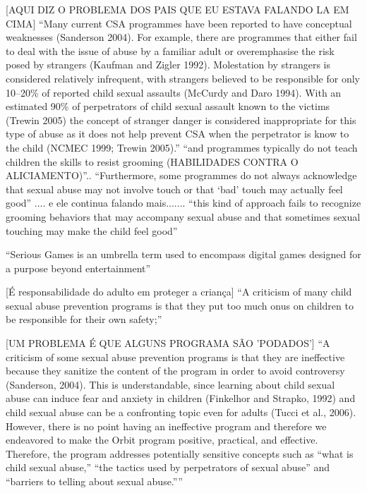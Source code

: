 [AQUI DIZ O PROBLEMA DOS PAIS QUE EU ESTAVA FALANDO LA EM CIMA]
``Many current CSA programmes have been reported to have conceptual weaknesses (Sanderson 2004). For example, there are programmes that either fail to deal with the issue of abuse by a familiar adult or overemphasise the risk posed by strangers (Kaufman and Zigler 1992). Molestation by strangers is considered relatively infrequent, with strangers believed to be responsible for only 10–20\% of reported child sexual assaults (McCurdy and Daro 1994). With an estimated 90\% of perpetrators of child sexual assault known to the victims (Trewin 2005) the concept of stranger danger is considered inappropriate for this type of abuse as it does not help prevent CSA when the perpetrator is know to the child (NCMEC 1999; Trewin 2005).''\cite{dip2016advancing} ``and programmes typically do not teach children the skills to resist grooming (HABILIDADES CONTRA O ALICIAMENTO)''.. ``Furthermore, some programmes do not always acknowledge that sexual abuse may not involve touch or that ‘bad’ touch may actually feel good'' .... e ele continua falando mais....... ``this kind of approach fails to recognize grooming behaviors that may accompany sexual abuse and that sometimes sexual touching may make the child feel good''



``Serious Games is an umbrella term used to encompass digital games designed for a purpose beyond entertainment''\cite{dip2016advancing}


[É responsabilidade do adulto em proteger a criança]
``A criticism of many child sexual abuse prevention programs is that they put too much onus on children to be responsible for their own safety;'' \cite{dip2016advancing}

[UM PROBLEMA É QUE ALGUNS PROGRAMA SÃO 'PODADOS']
``A criticism of some sexual abuse prevention programs is that they are ineffective because they sanitize the content of the program in order to avoid controversy (Sanderson, 2004). This is understandable, since learning about child sexual abuse can induce fear and anxiety in children (Finkelhor and Strapko, 1992) and child sexual abuse can be a confronting topic even for adults (Tucci et al., 2006). However, there is no point having an ineffective program and therefore we endeavored to make the Orbit program positive, practical, and effective. Therefore, the program addresses potentially sensitive concepts such as “what is child sexual abuse,” “the tactics used by perpetrators of sexual abuse” and “barriers to telling about sexual abuse.”'' \cite{dip2016advancing}

